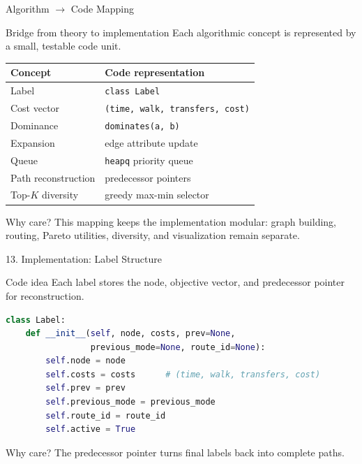 \documentclass[aspectratio=169]{beamer}
\begin{document}
\begin{frame}[shrink=8]{Algorithm \(\rightarrow\) Code Mapping}
    \begin{block}{Bridge from theory to implementation}
        Each algorithmic concept is represented by a small, testable code unit.
    \end{block}

    \begin{center}
    \begin{tabular}{ll}
        \toprule
        \textbf{Concept} & \textbf{Code representation}\\
        \midrule
        Label & \texttt{class Label}\\
        Cost vector & \texttt{(time, walk, transfers, cost)}\\
        Dominance & \texttt{dominates(a, b)}\\
        Expansion & edge attribute update\\
        Queue & \texttt{heapq} priority queue\\
        Path reconstruction & predecessor pointers\\
        Top-\(K\) diversity & greedy max-min selector\\
        \bottomrule
    \end{tabular}
    \end{center}

    \begin{alertblock}{Why care?}
        This mapping keeps the implementation modular: graph building, routing, Pareto utilities, diversity, and visualization remain separate.
    \end{alertblock}
\end{frame}

\begin{frame}[fragile]{13. Implementation: Label Structure}
    \begin{block}{Code idea}
        Each label stores the node, objective vector, and predecessor pointer for reconstruction.
    \end{block}

\begin{lstlisting}[language=Python]
class Label:
    def __init__(self, node, costs, prev=None,
                 previous_mode=None, route_id=None):
        self.node = node
        self.costs = costs      # (time, walk, transfers, cost)
        self.prev = prev
        self.previous_mode = previous_mode
        self.route_id = route_id
        self.active = True
\end{lstlisting}

    \begin{alertblock}{Why care?}
        The predecessor pointer turns final labels back into complete paths.
    \end{alertblock}
\end{frame}
\end{document}
